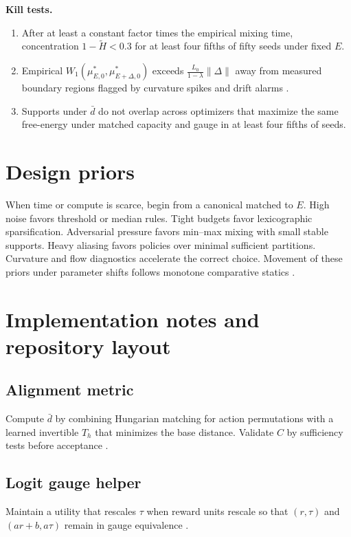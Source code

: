 \documentclass[11pt]{article}
\newcommand{\1}{\mathbbm{1}}
\newcommand{\Wone}{W_1}
\begin{document}
\noindent\textbf{Kill tests.}
\begin{enumerate}[leftmargin=2em]
    \item After at least a constant factor times the empirical mixing time, concentration $1 - \tilde H < 0.3$ for at least four fifths of fifty seeds under fixed $E$.
    \item Empirical $\Wone(\mu^*_{E,0},\mu^*_{E+\Delta,0})$ exceeds $\frac{L_0}{1-\lambda}\|\Delta\|$ away from measured boundary regions flagged by curvature spikes and drift alarms \parencite{Villani2009}.
    \item Supports under $\bar d$ do not overlap across optimizers that maximize the same free-energy under matched capacity and gauge in at least four fifths of seeds.
\end{enumerate}

\section{Design priors}
When time or compute is scarce, begin from a canonical matched to $E$. High noise favors threshold or median rules. Tight budgets favor lexicographic sparsification. Adversarial pressure favors min–max mixing with small stable supports. Heavy aliasing favors policies over minimal sufficient partitions. Curvature and flow diagnostics accelerate the correct choice. Movement of these priors under parameter shifts follows monotone comparative statics \parencite{Topkis1998,MilgromShannon1994}.

\section{Implementation notes and repository layout}
\subsection{Alignment metric}
Compute $\bar d$ by combining Hungarian matching for action permutations with a learned invertible $T_h$ that minimizes the base distance. Validate $C$ by sufficiency tests before acceptance \parencite{Blackwell1953}.

\subsection{Logit gauge helper}
Maintain a utility that rescales $\tau$ when reward units rescale so that $(r,\tau)$ and $(a r + b, a\tau)$ remain in gauge equivalence \parencite{CoverThomas2006}.
\end{document}
